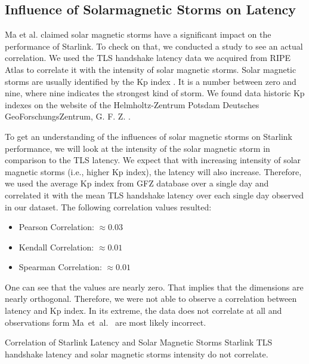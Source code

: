 \subsection{Influence of Solarmagnetic Storms on Latency}
\label{sec:solarmagnetic-storms}

Ma et al. \cite{DBLP:conf/infocom/MaCZCML23} claimed solar magnetic storms have
a significant impact on the performance of Starlink. To check on that, we
conducted a study to see an actual correlation. We used the TLS handshake
latency data we acquired from RIPE Atlas to correlate it with the intensity of
solar magnetic storms. Solar magnetic storms are usually identified by the Kp
index \cite{Bartels1957}. It is a number between zero and nine, where nine
indicates the strongest kind of storm. We found data historic Kp indexes on the
website of the Helmholtz-Zentrum Potsdam Deutsches GeoForschungsZentrum, G. F.
Z. \cite{GFZ2023}.

To get an understanding of the influences of solar magnetic storms on Starlink
performance, we will look at the intensity of the solar magnetic storm in
comparison to the TLS latency. We expect that with increasing intensity of
solar magnetic storms (i.e., higher Kp index), the latency will also increase.
Therefore, we used the average Kp index from GFZ database over a single day and
correlated it with the mean TLS handshake latency over each single day observed
in our dataset. The following correlation values resulted:

\begin{itemize}
	\item Pearson Correlation: $\approx 0.03$
	\item Kendall Correlation: $\approx 0.01$
	\item Spearman Correlation: $\approx 0.01$
\end{itemize}

One can see that the values are nearly zero. That implies that the dimensions
are nearly orthogonal. Therefore, we were not able to observe a correlation
between latency and Kp index. In its extreme, the data does not correlate at
all and observations form Ma~et~al.~\cite{DBLP:conf/infocom/MaCZCML23} are most
likely incorrect.

\begin{takeaway}{Correlation of Starlink Latency and Solar Magnetic Storms}
	Starlink TLS handshake latency and solar magnetic storms intensity do
	not correlate.
\end{takeaway}

